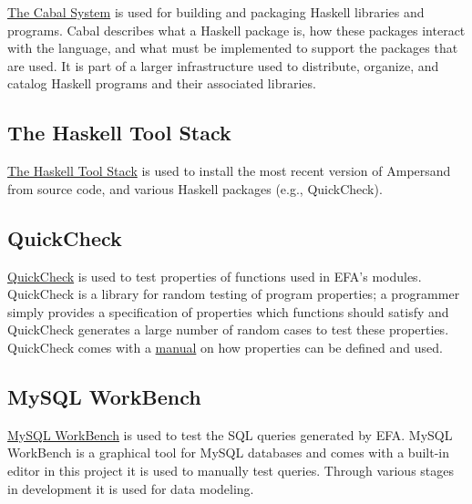 \documentclass[journal,12pt,onecolumn,draftclsnofoot]{report}
\let\Oldsubsection\subsection
\renewcommand{\subsection}{\FloatBarrier\Oldsubsection}
\begin{document}
 
\noindent
\href{https://www.haskell.org/cabal/}{The Cabal System} is used for building 
and packaging Haskell libraries and programs. 
Cabal describes what a Haskell package is, how these packages interact with the 
language, and what must be implemented to support the packages that are used. 
It is part of a larger infrastructure used to distribute, organize, and catalog 
Haskell programs and their associated libraries. \cite{hackage}

\subsection*{The Haskell Tool Stack}
\noindent
\href{https://www.haskell.org/cabal/}{The Haskell Tool Stack} is used to 
install the most recent version of Ampersand from source code, and various 
Haskell packages (e.g., QuickCheck).

\subsection*{QuickCheck}
\noindent
\href{https://hackage.haskell.org/package/QuickCheck}{QuickCheck} is used to 
test properties of functions used in EFA's modules. QuickCheck is a library for 
random testing of program properties; a programmer simply provides a 
specification of properties which functions should satisfy
and QuickCheck generates a large number of random cases to test these properties.
QuickCheck comes with a
\href{http://www.cse.chalmers.se/~rjmh/QuickCheck/manual.html}{manual} on how 
properties can be defined and used. 

\subsection*{MySQL WorkBench}
\noindent
\href{https://dev.mysql.com/doc/workbench/en/}{MySQL WorkBench} is used to test 
the SQL queries generated by EFA. MySQL WorkBench is a graphical tool for MySQL 
databases and comes with a built-in editor in this project it is used to 
manually test queries. Through various stages in development it is used for 
data modeling.
\end{document}

